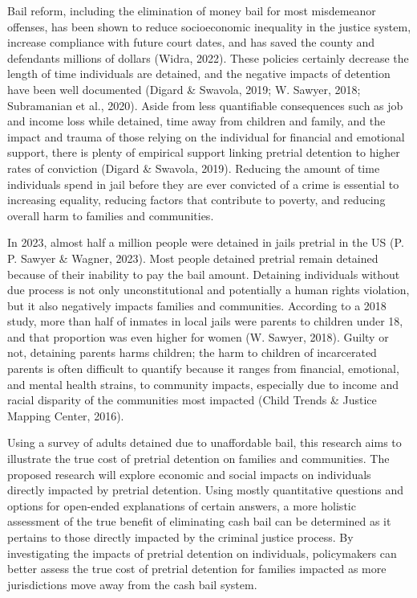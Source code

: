 \documentclass[
  letterpaper,
  DIV=11,
  numbers=noendperiod]{scrartcl}
\begin{document}
Bail reform, including the elimination of money bail for most
misdemeanor offenses, has been shown to reduce socioeconomic inequality
in the justice system, increase compliance with future court dates, and
has saved the county and defendants millions of dollars (Widra, 2022).
These policies certainly decrease the length of time individuals are
detained, and the negative impacts of detention have been well
documented (Digard \& Swavola, 2019; W. Sawyer, 2018; Subramanian et
al., 2020). Aside from less quantifiable consequences such as job and
income loss while detained, time away from children and family, and the
impact and trauma of those relying on the individual for financial and
emotional support, there is plenty of empirical support linking pretrial
detention to higher rates of conviction (Digard \& Swavola, 2019).
Reducing the amount of time individuals spend in jail before they are
ever convicted of a crime is essential to increasing equality, reducing
factors that contribute to poverty, and reducing overall harm to
families and communities.

In 2023, almost half a million people were detained in jails pretrial in
the US (P. P. Sawyer \& Wagner, 2023). Most people detained pretrial
remain detained because of their inability to pay the bail amount.
Detaining individuals without due process is not only unconstitutional
and potentially a human rights violation, but it also negatively impacts
families and communities. According to a 2018 study, more than half of
inmates in local jails were parents to children under 18, and that
proportion was even higher for women (W. Sawyer, 2018). Guilty or not,
detaining parents harms children; the harm to children of incarcerated
parents is often difficult to quantify because it ranges from financial,
emotional, and mental health strains, to community impacts, especially
due to income and racial disparity of the communities most impacted
(Child Trends \& Justice Mapping Center, 2016).

Using a survey of adults detained due to unaffordable bail, this
research aims to illustrate the true cost of pretrial detention on
families and communities. The proposed research will explore economic
and social impacts on individuals directly impacted by pretrial
detention. Using mostly quantitative questions and options for
open-ended explanations of certain answers, a more holistic assessment
of the true benefit of eliminating cash bail can be determined as it
pertains to those directly impacted by the criminal justice process. By
investigating the impacts of pretrial detention on individuals,
policymakers can better assess the true cost of pretrial detention for
families impacted as more jurisdictions move away from the cash bail
system.
\end{document}
